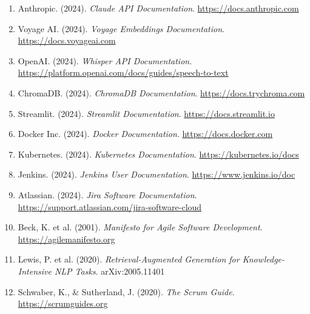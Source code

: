 \documentclass[12pt,a4paper]{report}
\begin{document}
\begin{enumerate}[leftmargin=2cm]
    \item Anthropic. (2024). \textit{Claude API Documentation}. \url{https://docs.anthropic.com}
    \item Voyage AI. (2024). \textit{Voyage Embeddings Documentation}. \url{https://docs.voyageai.com}
    \item OpenAI. (2024). \textit{Whisper API Documentation}. \url{https://platform.openai.com/docs/guides/speech-to-text}
    \item ChromaDB. (2024). \textit{ChromaDB Documentation}. \url{https://docs.trychroma.com}
    \item Streamlit. (2024). \textit{Streamlit Documentation}. \url{https://docs.streamlit.io}
    \item Docker Inc. (2024). \textit{Docker Documentation}. \url{https://docs.docker.com}
    \item Kubernetes. (2024). \textit{Kubernetes Documentation}. \url{https://kubernetes.io/docs}
    \item Jenkins. (2024). \textit{Jenkins User Documentation}. \url{https://www.jenkins.io/doc}
    \item Atlassian. (2024). \textit{Jira Software Documentation}. \url{https://support.atlassian.com/jira-software-cloud}
    \item Beck, K. et al. (2001). \textit{Manifesto for Agile Software Development}. \url{https://agilemanifesto.org}
    \item Lewis, P. et al. (2020). \textit{Retrieval-Augmented Generation for Knowledge-Intensive NLP Tasks}. arXiv:2005.11401
    \item Schwaber, K., \& Sutherland, J. (2020). \textit{The Scrum Guide}. \url{https://scrumguides.org}
\end{enumerate}
\end{document}
